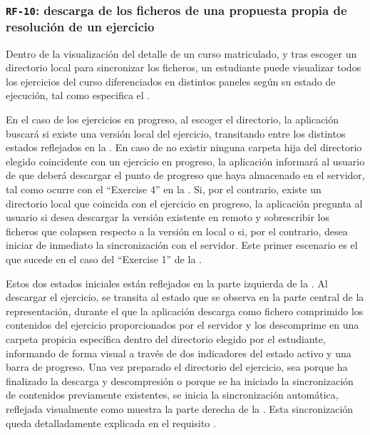 \subsubsection{\texttt{RF-10}: descarga de los ficheros de una propuesta propia de resolución de un ejercicio}
\label{subsec:rf10}

Dentro de la visualización del detalle de un curso matriculado, y tras escoger un directorio local para sincronizar los ficheros, un estudiante puede visualizar todos los ejercicios del curso diferenciados en distintos paneles según su estado de ejecución, tal como especifica el .

En el caso de los ejercicios en progreso, al escoger el directorio, la aplicación buscará si existe una versión local del ejercicio, transitando entre los distintos estados reflejados en la . En caso de no existir ninguna carpeta hija del directorio elegido coincidente con un ejercicio en progreso, la aplicación informará al usuario de que deberá descargar el punto de progreso que haya almacenado en el servidor, tal como ocurre con el ``Exercise 4'' en la . Si, por el contrario, existe un directorio local que coincida con el ejercicio en progreso, la aplicación pregunta al usuario si desea descargar la versión existente en remoto y sobrescribir los ficheros que colapsen respecto a la versión en local o si, por el contrario, desea iniciar de inmediato la sincronización con el servidor. Este primer escenario es el que sucede en el caso del ``Exercise 1'' de la .

Estos dos estados iniciales están reflejados en la parte izquierda de la . Al descargar el ejercicio, se transita al estado que se observa en la parte central de la representación, durante el que la aplicación descarga como fichero comprimido los contenidos del ejercicio proporcionados por el servidor y los descomprime en una carpeta propicia específica dentro del directorio elegido por el estudiante, informando de forma visual a través de dos indicadores del estado activo y una barra de progreso. Una vez preparado el directorio del ejercicio, sea porque ha finalizado la descarga y descompresión o porque se ha iniciado la sincronización de contenidos previamente existentes, se inicia la sincronización automática, reflejada visualmente como muestra la parte derecha de la . Esta sincronización queda detalladamente explicada en el requisito .

